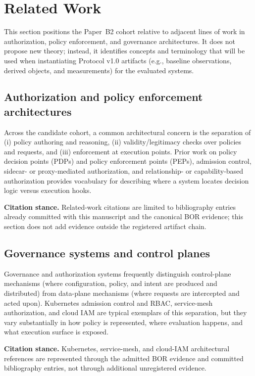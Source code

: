 \section{Related Work}
\label{sec:related-work}
This section positions the Paper~B2 cohort relative to adjacent lines of work in authorization, policy enforcement, and governance architectures. It does not propose new theory; instead, it identifies concepts and terminology that will be used when instantiating Protocol v1.0 artifacts (e.g., baseline observations, derived objects, and measurements) for the evaluated systems.

\subsection{Authorization and policy enforcement architectures}
Across the candidate cohort, a common architectural concern is the separation of (i) policy authoring and reasoning, (ii) validity/legitimacy checks over policies and requests, and (iii) enforcement at execution points. Prior work on policy decision points (PDPs) and policy enforcement points (PEPs), admission control, sidecar- or proxy-mediated authorization, and relationship- or capability-based authorization provides vocabulary for describing where a system locates decision logic versus execution hooks.

\textbf{Citation stance.} Related-work citations are limited to bibliography entries already committed with this manuscript and the canonical BOR evidence; this section does not add evidence outside the registered artifact chain.

\subsection{Governance systems and control planes}
Governance and authorization systems frequently distinguish control-plane mechanisms (where configuration, policy, and intent are produced and distributed) from data-plane mechanisms (where requests are intercepted and acted upon). Kubernetes admission control and RBAC, service-mesh authorization, and cloud IAM are typical exemplars of this separation, but they vary substantially in how policy is represented, where evaluation happens, and what execution surface is exposed.

\textbf{Citation stance.} Kubernetes, service-mesh, and cloud-IAM architectural references are represented through the admitted BOR evidence and committed bibliography entries, not through additional unregistered evidence.

